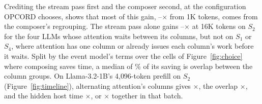 \label{subsec:ablation}
Crediting the stream pass first and the composer second, at the configuration OPCORD chooses, shows that most of this gain, \ComposerShareLo--\ComposerShareHi$\times$ from 1K tokens, comes from the composer's regrouping.
The stream pass alone gains \StreamSTwoLo--\StreamSTwoHi$\times$ at 16K tokens on $S_2$ for the four LLMs whose attention waits between its columns, but not on $S_1$ or $S_4$, where attention has one column or already issues each column's work before it waits.
Split by the event model's terms over the cells of Figure~\ref{fig:choice} where composing saves time, a median of \DecompOverlapShare\% of its saving is overlap between the column groups.
On Llama-3.2-1B's 4{,}096-token prefill on $S_2$ (Figure~\ref{fig:timeline}), alternating attention's columns gives \DecompAlt$\times$, the overlap \DecompOverlap$\times$, and the hidden host time \DecompHost$\times$, or \DecompTotal$\times$ together in that batch.

